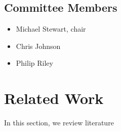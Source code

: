 \documentclass[manuscript,screen,review]{acmart}
\begin{document}
    
\subsection{Committee Members}
\begin{itemize}
    \item Michael Stewart, chair
    \item Chris Johnson %
    \item Philip Riley

\end{itemize}











    


\section{Related Work}



In this section, we review literature 
\end{document}

